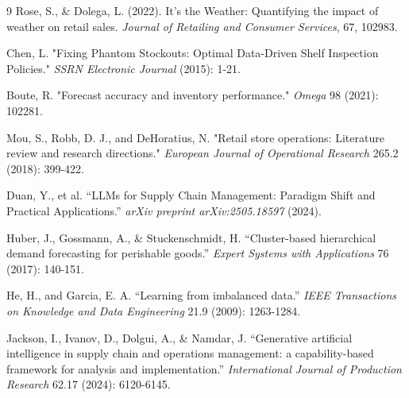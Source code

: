 \documentclass[11pt, a4paper]{article}
\begin{document}
\begin{thebibliography}{9}
Rose, S., \& Dolega, L. (2022). It's the Weather: Quantifying the impact of weather on retail sales. \textit{Journal of Retailing and Consumer Services}, 67, 102983.


Chen, L. "Fixing Phantom Stockouts: Optimal Data-Driven Shelf Inspection Policies." \textit{SSRN Electronic Journal} (2015): 1-21.

Boute, R. "Forecast accuracy and inventory performance." \textit{Omega} 98 (2021): 102281.

Mou, S., Robb, D. J., and DeHoratius, N. "Retail store operations: Literature review and research directions." \textit{European Journal of Operational Research} 265.2 (2018): 399-422.

Duan, Y., et al. ``LLMs for Supply Chain Management: Paradigm Shift and Practical Applications.'' \textit{arXiv preprint arXiv:2505.18597} (2024).

Huber, J., Gossmann, A., \& Stuckenschmidt, H. ``Cluster-based hierarchical demand forecasting for perishable goods.'' \textit{Expert Systems with Applications} 76 (2017): 140-151.

He, H., and Garcia, E. A. ``Learning from imbalanced data.'' \textit{IEEE Transactions on Knowledge and Data Engineering} 21.9 (2009): 1263-1284.

Jackson, I., Ivanov, D., Dolgui, A., & Namdar, J. ``Generative artificial intelligence in supply chain and operations management: a capability-based framework for analysis and implementation.'' \textit{International Journal of Production Research} 62.17 (2024): 6120-6145.

\end{thebibliography}
\end{document}
